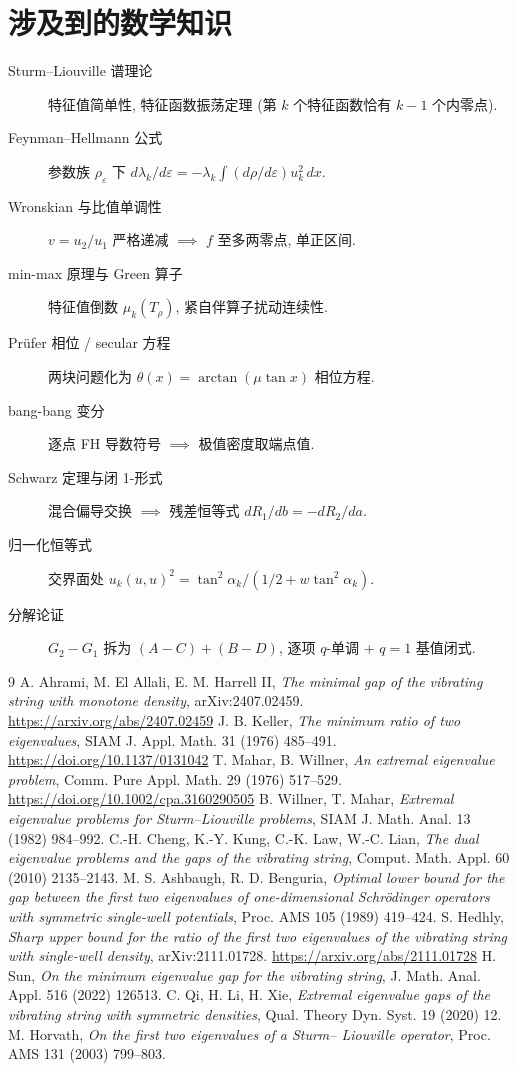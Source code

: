 \documentclass[UTF8]{ctexart}
\begin{document}
\section{涉及到的数学知识}

\begin{description}
	\item[Sturm--Liouville 谱理论] 特征值简单性, 特征函数振荡定理
		(第 $k$ 个特征函数恰有 $k-1$ 个内零点).
	\item[Feynman--Hellmann 公式] 参数族 $\rho_\varepsilon$ 下
		$d\lambda_k/d\varepsilon = -\lambda_k\int (d\rho/d\varepsilon)u_k^2\,dx$.
	\item[Wronskian 与比值单调性] $v = u_2/u_1$ 严格递减
		$\implies$ $f$ 至多两零点, 单正区间.
	\item[min-max 原理与 Green 算子] 特征值倒数 $\mu_k(T_\rho)$,
		紧自伴算子扰动连续性.
	\item[Pr\"ufer 相位 / secular 方程] 两块问题化为
		$\theta(x)=\arctan(\mu\tan x)$ 相位方程.
	\item[bang-bang 变分] 逐点 FH 导数符号 $\implies$ 极值密度取端点值.
	\item[Schwarz 定理与闭 1-形式] 混合偏导交换
		$\implies$ 残差恒等式 $dR_1/db=-dR_2/da$.
	\item[归一化恒等式] 交界面处
		$u_k(u,u)^2=\tan^2\alpha_k/(1/2+w\tan^2\alpha_k)$.
	\item[分解论证] $G_2-G_1$ 拆为 $(A-C)+(B-D)$,
		逐项 $q$-单调 + $q=1$ 基值闭式.
\end{description}

\begin{thebibliography}{9}
 A. Ahrami, M. El Allali, E. M. Harrell II, \emph{The minimal gap
	of the vibrating string with monotone density}, arXiv:2407.02459.
	\url{https://arxiv.org/abs/2407.02459}
 J. B. Keller, \emph{The minimum ratio of two eigenvalues},
	SIAM J. Appl. Math. 31 (1976) 485--491.
	\url{https://doi.org/10.1137/0131042}
 T. Mahar, B. Willner, \emph{An extremal eigenvalue problem},
	Comm. Pure Appl. Math. 29 (1976) 517--529.
	\url{https://doi.org/10.1002/cpa.3160290505}
 B. Willner, T. Mahar, \emph{Extremal eigenvalue problems for
	Sturm--Liouville problems}, SIAM J. Math. Anal. 13 (1982) 984--992.
 C.-H. Cheng, K.-Y. Kung, C.-K. Law, W.-C. Lian, \emph{The
	dual eigenvalue problems and the gaps of the vibrating string},
	Comput. Math. Appl. 60 (2010) 2135--2143.
 M. S. Ashbaugh, R. D. Benguria, \emph{Optimal lower bound for the
	gap between the first two eigenvalues of one-dimensional Schr\"odinger
	operators with symmetric single-well potentials}, Proc. AMS 105 (1989)
	419--424.
 S. Hedhly, \emph{Sharp upper bound for the ratio of the first two
	eigenvalues of the vibrating string with single-well density},
	arXiv:2111.01728. \url{https://arxiv.org/abs/2111.01728}
 H. Sun, \emph{On the minimum eigenvalue gap for the vibrating
	string}, J. Math. Anal. Appl. 516 (2022) 126513.
 C. Qi, H. Li, H. Xie, \emph{Extremal eigenvalue gaps of the
	vibrating string with symmetric densities}, Qual. Theory Dyn. Syst. 19
	(2020) 12.
 M. Horvath, \emph{On the first two eigenvalues of a Sturm--
	Liouville operator}, Proc. AMS 131 (2003) 799--803.
\end{thebibliography}
\end{document}
